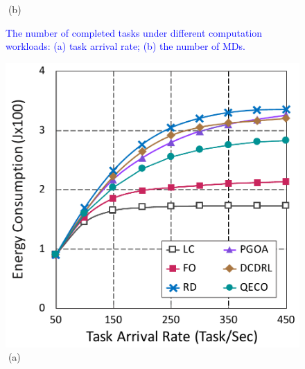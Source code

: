 \documentclass[12pt,draftclsnofoot,onecolumn]{IEEEtran}
\begin{document}
\begin{enumerate}
\begin{figure}[H]
\begin{minipage}[b]{0.3\linewidth}
		\textcolor{white}{i}\hspace{0.6cm}(b)
	\end{minipage}
	\caption{\textcolor{blue}{The number of completed tasks under different computation workloads: (a) task arrival rate; (b) the number of MDs.}}
	\label{chart1}
\end{figure}\vspace{-8mm}
\begin{figure}[H]\centering
	\captionsetup{name=Fig.}
	\begin{minipage}[b]{0.3\linewidth}
		\centering
		\includegraphics[width=\textwidth]{ energy_1} 		
		\textcolor{white}{i}\hspace{0.6cm}(a)
	\end{minipage}
	\hspace{-0.2cm}
	\begin{minipage}[b]{0.3\linewidth}
		\centering

\end{minipage}
\end{figure}
\end{enumerate}
\end{document}
